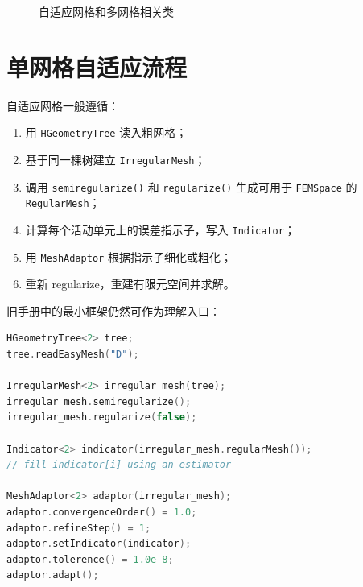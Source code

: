 \documentclass[UTF8,openany,zihao=-4,scheme=chinese]{ctexbook}
\newcommand{\class}[1]{\texttt{#1}}
\begin{document}
\begin{figure}[htbp]
\caption{自适应网格和多网格相关类}
\label{fig:adaptive-uml}
\end{figure}

\section{单网格自适应流程}

自适应网格一般遵循：

\begin{enumerate}[leftmargin=2em]
  \item 用 \class{HGeometryTree} 读入粗网格；
  \item 基于同一棵树建立 \class{IrregularMesh}；
  \item 调用 \class{semiregularize()} 和 \class{regularize()} 生成可用于 \class{FEMSpace} 的 \class{RegularMesh}；
  \item 计算每个活动单元上的误差指示子，写入 \class{Indicator}；
  \item 用 \class{MeshAdaptor} 根据指示子细化或粗化；
  \item 重新 regularize，重建有限元空间并求解。
\end{enumerate}

旧手册中的最小框架仍然可作为理解入口：

\begin{lstlisting}[language=C++]
HGeometryTree<2> tree;
tree.readEasyMesh("D");

IrregularMesh<2> irregular_mesh(tree);
irregular_mesh.semiregularize();
irregular_mesh.regularize(false);

Indicator<2> indicator(irregular_mesh.regularMesh());
// fill indicator[i] using an estimator

MeshAdaptor<2> adaptor(irregular_mesh);
adaptor.convergenceOrder() = 1.0;
adaptor.refineStep() = 1;
adaptor.setIndicator(indicator);
adaptor.tolerence() = 1.0e-8;
adaptor.adapt();
\end{lstlisting}
\end{document}
